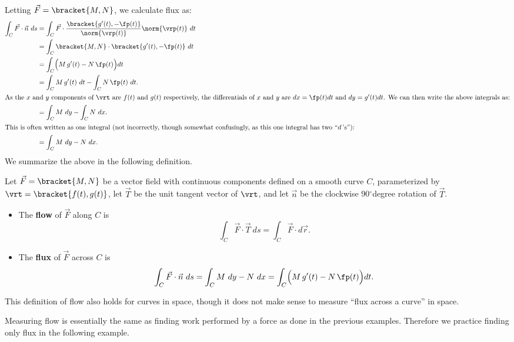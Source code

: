 Letting $\vec F =\bracket{M,N}$, we calculate flux as:
\begin{align*}
\int_C \vec F\cdot \vec n\ ds &= \int_C \vec F\cdot \frac{\bracket{g'(t),-\fp(t)}}{\norm{\vrp(t)}} \norm{\vrp(t)}\ dt \\
				&= \int_C\bracket{M,N}\cdot\bracket{g'(t),-\fp(t)}\ dt \\
				&= \int_C \Bigl(M\,g'(t) - N\,\fp(t)\Bigr)dt\\
				&= \int_C M\,g'(t)\ dt - \int_C N\,\fp(t)\ dt.\\
				\intertext{As the $x$ and $y$ components of $\vrt$ are $f(t)$ and $g(t)$ respectively, the differentials of $x$ and $y$ are $dx = \fp(t)dt$ and $dy=g'(t)dt$. We can then write the above integrals as:}
				&= \int_C M\ dy - \int_C N\ dx.\\
				\intertext{This is often written as one integral (not incorrectly, though somewhat confusingly, as this one integral has two ``$d$\,'s''):}
				&=\int_CM\ dy -N\ dx.
\end{align*}
We summarize the above in the following definition.

\begin{definition}\label{def:flowflux}
Let $\vec F=\bracket{M,N}$ be a vector field with continuous components defined on a smooth curve $C$, parameterized by $\vrt =\bracket{f(t),g(t)}$, let $\vec T$ be the unit tangent vector of $\vrt$, and let $\vec n$ be the clockwise 90$^\circ$degree rotation of $\vec T$.
\begin{itemize}
	\item The \textbf{flow} of $\vec F$ along $C$ is
\[\int_C \vec F\cdot\vec T\ ds=\int_C \vec F\cdot d\vec r.\]
	\item The \textbf{flux} of $\vec F$ across $C$ is
\[
\int_C \vec F\cdot \vec n\ ds =  \int_C M\ dy -N\ dx = \int_C\Bigl(M\,g'(t) - N\,\fp(t)\Bigr)dt.
\]
\end{itemize}
\end{definition}

This definition of flow also holds for curves in space, though it does not make sense to measure ``flux across a curve'' in space.

Measuring flow is essentially the same as finding work performed by a force as done in the previous examples. Therefore we practice finding only flux in the following example.

